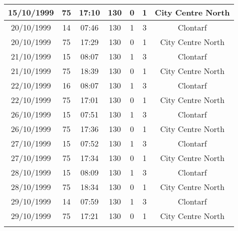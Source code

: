 \begin{longtable}[htbp] {ccccccc}
\hline 15/10/1999& 75& 17:10& 130& 0& 1&
City Centre North \\
\hline 20/10/1999& 14& 07:46& 130& 1& 3&
Clontarf \\
\hline 20/10/1999& 75& 17:29& 130& 0& 1&
City Centre North \\
\hline 21/10/1999& 15& 08:07& 130& 1& 3&
Clontarf \\
\hline 21/10/1999& 75& 18:39& 130& 0& 1&
City Centre North \\
\hline 22/10/1999& 16& 08:07& 130& 1& 3&
Clontarf \\
\hline 22/10/1999& 75& 17:01& 130& 0& 1&
City Centre North \\
\hline 26/10/1999& 15& 07:51& 130& 1& 3&
Clontarf \\
\hline 26/10/1999& 75& 17:36& 130& 0& 1&
City Centre North \\
\hline 27/10/1999& 15& 07:52& 130& 1& 3&
Clontarf \\
\hline 27/10/1999& 75& 17:34& 130& 0& 1&
City Centre North \\
\hline 28/10/1999& 15& 08:09& 130& 1& 3&
Clontarf \\
\hline 28/10/1999& 75& 18:34& 130& 0& 1&
City Centre North \\
\hline 29/10/1999& 14& 07:59& 130& 1& 3&
Clontarf \\
\hline 29/10/1999& 75& 17:21& 130& 0& 1& City Centre North \\ \hline \label{tab16}
\end{longtable}
 \normalsize{} 


\newpage
